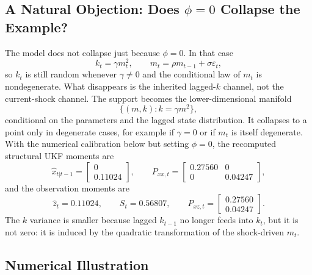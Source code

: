 \subsection{A Natural Objection: Does \texorpdfstring{$\phi=0$}{phi = 0} Collapse the Example?}
\label{subsec:bf-phi-zero-collapse}

The model does not collapse just because $\phi=0$.  In that case
\[
  k_t=\gamma m_t^2,
  \qquad
  m_t=\rho m_{t-1}+\sigma\varepsilon_t,
\]
so $k_t$ is still random whenever $\gamma\neq0$ and the conditional law of
$m_t$ is nondegenerate.  What disappears is the inherited lagged-$k$ channel,
not the current-shock channel.  The support becomes the lower-dimensional
manifold
\begin{equation}
  \{(m,k): k=\gamma m^2\},
\end{equation}
conditional on the parameters and the lagged state distribution.  It collapses
to a point only in degenerate cases, for example if $\gamma=0$ or if $m_t$ is
itself degenerate.  With the numerical calibration below but setting $\phi=0$,
the recomputed structural UKF moments are
\[
  \hat x_{t|t-1}
  =
  \begin{bmatrix}
    0\\0.11024
  \end{bmatrix},
  \qquad
  P_{xx,t}
  =
  \begin{bmatrix}
    0.27560 & 0\\
    0 & 0.04247
  \end{bmatrix},
\]
and the observation moments are
\[
  \hat z_t=0.11024,
  \qquad
  S_t=0.56807,
  \qquad
  P_{xz,t}=
  \begin{bmatrix}
    0.27560\\0.04247
  \end{bmatrix}.
\]
The $k$ variance is smaller because lagged $k_{t-1}$ no longer feeds into
$k_t$, but it is not zero: it is induced by the quadratic transformation of the
shock-driven $m_t$.

\subsection{Numerical Illustration}
\label{sec:bf-structural-ukf-numeric}

